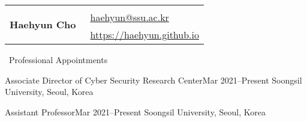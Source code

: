 \documentclass{resume} %
\providecommand*\email[1]{\href{mailto:#1}{#1}}
\begin{document}
\begin{table}[t]
\begin{tabular}{ll}
	\multirow{3}{*}{ \Huge\textbf{Haehyun Cho} } 
	& \\
	& \hspace{1.7cm}\faEnvelopeSquare~\email{haehyun@ssu.ac.kr}\\
	& \hspace{1.7cm}\faExternalLink~\href{https://haehyun.github.io}{https://haehyun.github.io} \\
\end{tabular}
\end{table}

\vspace{-10mm}

\begin{rSection}{\faGenderless~Professional Appointments}

	\begin{rSubsection2}
		{Associate Director of Cyber Security Research Center}{Mar 2021--Present}
		{Soongsil University, Seoul, Korea}{}
	\end{rSubsection2}
	\vspace{-2mm}
	\begin{rSubsection2}
		{Assistant Professor}{Mar 2021--Present}
		{Soongsil University, Seoul, Korea}{}
	\end{rSubsection2}
\end{rSection}
\end{document}
